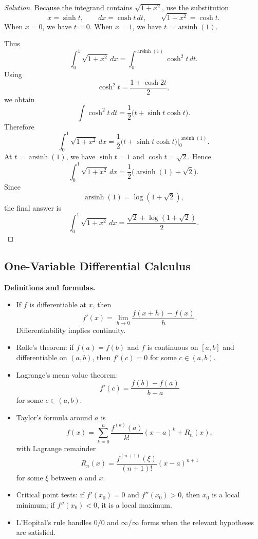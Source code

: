 \documentclass[11pt]{article}
\theoremstyle{definition}
\begin{document}
\begin{proof}[Solution]
Because the integrand contains $\sqrt{1+x^2}$, use the substitution
\[
x=\sinh t,
\qquad
dx=\cosh t\,dt,
\qquad
\sqrt{1+x^2}=\cosh t.
\]
When $x=0$, we have $t=0$. When $x=1$, we have $t=\operatorname{arsinh}(1)$.

Thus
\[
\int_0^1 \sqrt{1+x^2}\,dx
=\int_0^{\operatorname{arsinh}(1)} \cosh^2 t\,dt.
\]
Using
\[
\cosh^2 t=\frac{1+\cosh 2t}{2},
\]
we obtain
\[
\int \cosh^2 t\,dt=\frac12\bigl(t+\sinh t\cosh t\bigr).
\]
Therefore
\[
\int_0^1 \sqrt{1+x^2}\,dx
=\frac12\bigl(t+\sinh t\cosh t\bigr)\Big|_{0}^{\operatorname{arsinh}(1)}.
\]
At $t=\operatorname{arsinh}(1)$, we have $\sinh t=1$ and $\cosh t=\sqrt{2}$. Hence
\[
\int_0^1 \sqrt{1+x^2}\,dx
=\frac12\bigl(\operatorname{arsinh}(1)+\sqrt{2}\bigr).
\]
Since
\[
\operatorname{arsinh}(1)=\log(1+\sqrt{2}),
\]
the final answer is
\[
\boxed{\int_0^1 \sqrt{1+x^2}\,dx = \frac{\sqrt{2}+\log(1+\sqrt{2})}{2}}.
\]
\end{proof}

\subsection{One-Variable Differential Calculus}
\textbf{Definitions and formulas.}
\begin{itemize}
    \item If $f$ is differentiable at $x$, then
    \[
        f'(x)=\lim_{h\to 0}\frac{f(x+h)-f(x)}{h}.
    \]
    Differentiability implies continuity.
    \item Rolle's theorem: if $f(a)=f(b)$ and $f$ is continuous on $[a,b]$ and differentiable on $(a,b)$, then $f'(c)=0$ for some $c\in(a,b)$.
    \item Lagrange's mean value theorem:
    \[
        f'(c)=\frac{f(b)-f(a)}{b-a}
    \]
    for some $c\in(a,b)$.
    \item Taylor's formula around $a$ is
    \[
        f(x)=\sum_{k=0}^n \frac{f^{(k)}(a)}{k!}(x-a)^k + R_n(x),
    \]
    with Lagrange remainder
    \[
        R_n(x)=\frac{f^{(n+1)}(\xi)}{(n+1)!}(x-a)^{n+1}
    \]
    for some $\xi$ between $a$ and $x$.
    \item Critical point tests: if $f'(x_0)=0$ and $f''(x_0)>0$, then $x_0$ is a local minimum; if $f''(x_0)<0$, it is a local maximum.
    \item L'Hopital's rule handles $0/0$ and $\infty/\infty$ forms when the relevant hypotheses are satisfied.
\end{itemize}
\end{document}
